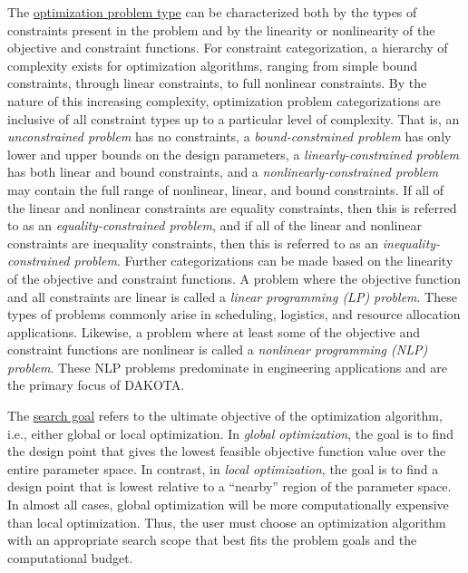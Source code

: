 The \underline{optimization problem type} can be characterized both by
the types of constraints present in the problem and by the linearity
or nonlinearity of the objective and constraint functions. For
constraint categorization, a hierarchy of complexity exists for
optimization algorithms, ranging from simple bound constraints,
through linear constraints, to full nonlinear constraints. By the
nature of this increasing complexity, optimization problem
categorizations are inclusive of all constraint types up to a
particular level of complexity. That is, an \emph{unconstrained
  problem} has no constraints, a \emph{bound-constrained problem} has
only lower and upper bounds on the design parameters, a
\emph{linearly-constrained problem} has both linear and bound
constraints, and a \emph{nonlinearly-constrained problem} may contain
the full range of nonlinear, linear, and bound constraints. If all of
the linear and nonlinear constraints are equality constraints, then
this is referred to as an \emph{equality-constrained problem}, and if
all of the linear and nonlinear constraints are inequality
constraints, then this is referred to as an
\emph{inequality-constrained problem}. Further categorizations can be
made based on the linearity of the objective and constraint functions.
A problem where the objective function and all constraints are linear
is called a \emph{linear programming (LP) problem}. These types of
problems commonly arise in scheduling, logistics, and resource
allocation applications. Likewise, a problem where at least some of
the objective and constraint functions are nonlinear is called a
\emph{nonlinear programming (NLP) problem}. These NLP problems
predominate in engineering applications and are the primary focus of
DAKOTA.

The \underline{search goal} refers to the ultimate objective of the
optimization algorithm, i.e., either global or local optimization. In
\emph{global optimization}, the goal is to find the design point that
gives the lowest feasible objective function value over the entire
parameter space. In contrast, in \emph{local optimization}, the goal
is to find a design point that is lowest relative to a ``nearby''
region of the parameter space. In almost all cases, global
optimization will be more computationally expensive than local
optimization. Thus, the user must choose an optimization algorithm
with an appropriate search scope that best fits the problem goals and
the computational budget.

